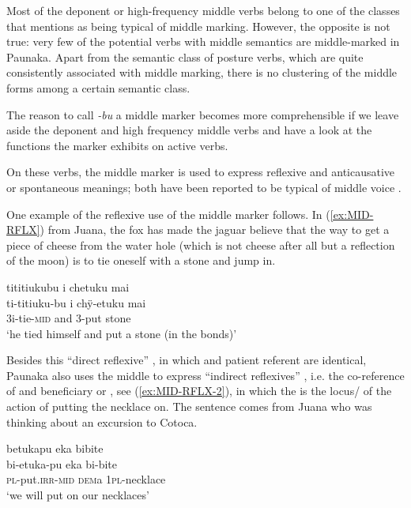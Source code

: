 Most of the deponent or high-frequency middle verbs belong to one of the classes that \citet[]{Kemmer1993} mentions as being typical of middle marking. However, the opposite is not true: very few of the potential verbs with middle semantics are middle-marked in Paunaka. Apart from the semantic class of posture verbs, which are quite consistently associated with middle marking, there is no clustering of the middle forms among a certain semantic class. 

The reason to call \textit{-bu} a middle marker becomes more comprehensible if we leave aside the deponent and high frequency middle verbs and have a look at the functions the marker exhibits on active  verbs.

\hspace*{-1.2pt}On these verbs, the middle marker is used to express reflexive and anticausative or spontaneous meanings; both have been reported to be typical of middle voice \citep[cf.][1149--1150]{Shibatani2004}.

One example of the reflexive use of the middle marker follows. In (\ref{ex:MID-RFLX}) from Juana, the fox has made the jaguar believe that the way to get a piece of cheese from the water hole (which is not cheese after all but a reflection of the moon) is to tie oneself with a stone and jump in.

\ea\label{ex:MID-RFLX}
\begingl 
\glpreamble tititiukubu i chetuku mai\\
\gla ti-titiuku-bu i chÿ-etuku mai\\ 
\glb 3i-tie-\textsc{mid} and 3-put stone\\ 
\glft ‘he tied himself and put a stone (in the bonds)’
 \trailingcitation{[jmx-n120429ls-x5.258-259]}
\xe

Besides this “direct reflexive” \citep[42]{Kemmer1993}, in which  and patient referent are identical, Paunaka also uses the middle to express “indirect reflexives” \citep[74]{Kemmer1993}, i.e. the co-reference of  and beneficiary or , see (\ref{ex:MID-RFLX-2}), in which the  is the locus/ of the action of putting the necklace on. The sentence comes from Juana who was thinking about an excursion to Cotoca.

\ea\label{ex:MID-RFLX-2}
\begingl 
\glpreamble betukapu eka bibite\\
\gla bi-etuka-pu eka bi-bite\\ 
\textsc{pl}-put.\textsc{irr}-\textsc{mid} \textsc{dem}a 1\textsc{pl}-necklace\\ 
\glft ‘we will put on our necklaces’
 \trailingcitation{[jxx-p120430l-2.608]}
\xe

